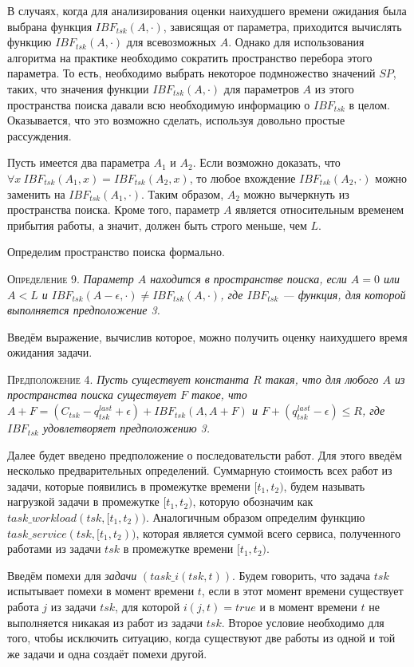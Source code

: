 В случаях, когда для анализирования оценки наихудшего времени ожидания была выбрана функция $IBF_{tsk}(A,\cdot)$,
  зависящая от параметра, приходится вычислять функцию $IBF_{tsk}(A,\cdot)$ для всевозможных $A$.
  Однако для использования алгоритма на практике необходимо сократить пространство перебора этого параметра.
  То есть, необходимо выбрать некоторое подмножество значений $SP$, таких, что значения
  функции $IBF_{tsk}(A,\cdot)$ для параметров $A$ из этого пространства поиска давали
  всю необходимую информацию о $IBF_{tsk}$ в целом. Оказывается, что
  это возможно сделать, используя довольно простые рассуждения.

Пусть имеется два параметра $A_1$ и $A_2$. Если возможно доказать, что
  $\forall x \ IBF_{tsk}(A_1,x) = IBF_{tsk}(A_2, x)$, то любое вхождение $IBF_{tsk}(A_2, \cdot)$
  можно заменить на $IBF_{tsk}(A_1,\cdot)$.
  Таким образом, $A_2$ можно вычеркнуть из пространства поиска.
  Кроме того, параметр $A$ является относительным временем прибытия работы,
  а значит, должен быть строго меньше, чем $L$.

Определим пространство поиска формально.

\textsc{Определение 9.}
\textit{Параметр $A$ находится в пространстве поиска, если $A = 0 $ или $A < L$ и $IBF_{tsk}(A - \epsilon, \cdot) \neq IBF_{tsk}(A,\cdot)$, где $IBF_{tsk}$ --- функция, для которой выполняется предположение 3. }

Введём выражение, вычислив которое, можно получить оценку наихудшего время ожидания задачи.

\textsc{Предположение 4.}
\textit{Пусть существует константа $R$ такая, что для любого $A$ из пространства
  поиска существует $F$ такое, что
  $A + F = (C_{tsk} - q_{tsk}^{last} +\epsilon) + IBF_{tsk}(A, A + F)$ и $F + (q_{tsk}^{last} - \epsilon) \leq R$,
  где $IBF_{tsk}$ удовлетворяет предположению 3. }

Далее будет введено предположение о последовательсти работ. Для этого введём
  несколько предварительных определений. Суммарную стоимость всех работ из задачи,
  которые появились в промежутке времени $[t_1, t_2)$, будем называть нагрузкой задачи
  в промежутке $[t_1, t_2)$, которую обозначим как $task\_workload(tsk, [t_1, t_2))$.
  Аналогичным образом определим функцию $task\_service(tsk, [t_1, t_2))$,
  которая является суммой всего сервиса, полученного работами из задачи $tsk$ в промежутке
  времени $[t_1, t_2)$.

Введём помехи для \textit{задачи} $(task\_i(tsk,t))$. Будем говорить, что задача $tsk$ испытывает помехи
  в момент времени $t$, если в этот момент времени существует работа $j$ из задачи $tsk$,
  для которой $i(j,t) = true$ и в момент времени $t$ не выполняется никакая из работ из задачи $tsk$.
  Второе условие необходимо для того, чтобы исключить ситуацию, когда существуют две работы из одной и той же
  задачи и одна создаёт помехи другой.

